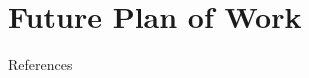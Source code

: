 \documentclass{ppt_sections/Tutan_beamer}
\begin{document}

\section{Future Plan of Work}



\bulletoff\begin{frame}[plain]{}
    \centering
    \huge{\textbf{}}
\end{frame}

\begin{frame}{References}
    \topline
	
	
\end{frame}







\end{document}
